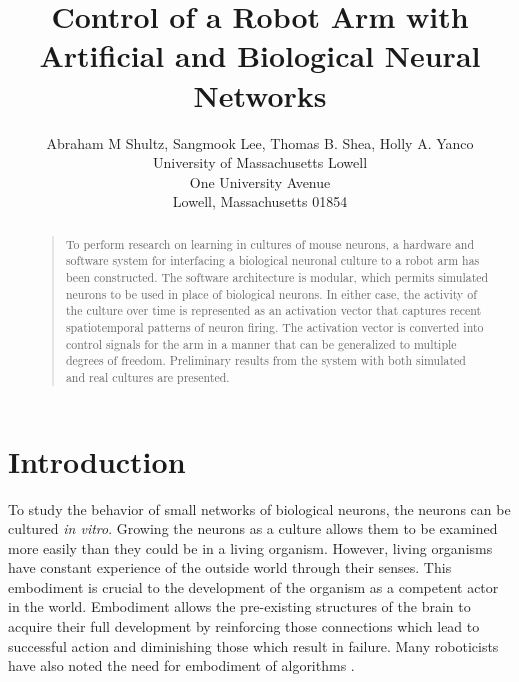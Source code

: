 \documentclass[letterpaper]{article}
\begin{document}
%
\title{Control of a Robot Arm with Artificial and Biological Neural Networks}
\author{Abraham M Shultz, Sangmook Lee, Thomas B. Shea, Holly A. Yanco\\
University of Massachusetts Lowell\\
One University Avenue\\
Lowell, Massachusetts 01854\\
}
\maketitle
\begin{abstract}
\begin{quote}
To perform research on learning in cultures of mouse neurons, a hardware and software system for interfacing a biological neuronal culture to a robot arm has been constructed. 
The software architecture is modular, which permits simulated neurons to be used in place of biological neurons. 
In either case, the activity of the culture over time is represented as an activation vector that captures recent spatiotemporal patterns of neuron firing. 
The activation vector is converted into control signals for the arm in a manner that can be generalized to multiple degrees of freedom. 
Preliminary results from the system with both simulated and real cultures are presented. 
\end{quote}
\end{abstract}

\section{Introduction}

To study the behavior of small networks of biological neurons, the neurons can be cultured \textit{in vitro}. 
Growing the neurons as a culture allows them to be examined more easily than they could be in a living organism. 
However, living organisms have constant experience of the outside world through their senses. 
This embodiment is crucial to the development of the organism as a competent actor in the world.
Embodiment allows the pre-existing structures of the brain to acquire their full development by reinforcing those connections which lead to successful action and diminishing those which result in failure. 
Many roboticists have also noted the need for embodiment of algorithms \cite{brooks1991intelligence,anderson2003embodied,chiel1997brain}. 
\end{document}
